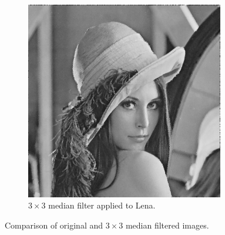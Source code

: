\documentclass{article}
\theoremstyle{problemstyle}
\begin{document}
\begin{problem}
\begin{enumerate}[a)]
\begin{enumerate}[i)]
\begin{figure}[H]
\begin{subfigure}{.45\textwidth}
				            \includegraphics[width=0.95\textwidth]{lena_median_3x3.png}
				            \caption{$ 3\times 3 $ median filter applied to Lena.}
				            \label{fig:lena_median_3x3}
			            \end{subfigure}
			            \caption{Comparison of original and $ 3\times 3 $ median filtered images.}
		            \end{figure}


\end{enumerate}
\end{enumerate}
\end{problem}
\end{document}
